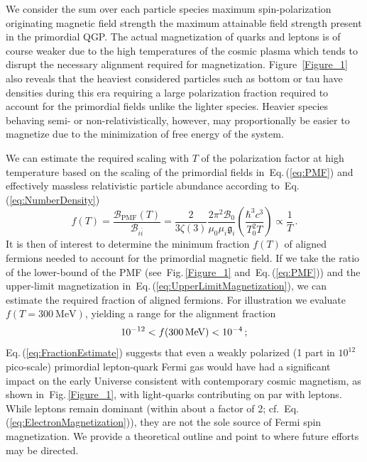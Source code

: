 \documentclass[epjST]{svjour}
\newcommand*{\MeV}{\text{\,MeV}}
\newcommand{\req}[1]{Eq.\,(\ref{#1})}
\newcommand{\rf}[1]{Fig.\,{\ref{#1}}}
\begin{document}
{\color{blue}We consider the sum over each particle species maximum spin-polarization originating magnetic field strength the maximum attainable field strength present in the primordial QGP. The actual magnetization of quarks and leptons is of course  weaker due to the high temperatures of the cosmic plasma which tends to disrupt the necessary alignment required for magnetization. Figure~\ref{Figure_1} also reveals that the heaviest considered particles such as bottom or tau have densities during this era requiring a large polarization fraction required to account for the primordial fields unlike the lighter species. Heavier species behaving semi- or non-relativistically, however, may proportionally be easier to magnetize due to the minimization of free energy of the system.}

{\color{red}We can estimate the required scaling with $T$ of the polarization factor at high temperature based on the scaling of the primordial fields in~\req{eq:PMF} and effectively massless relativistic particle abundance according to~\req{eq:NumberDensity}}
\begin{equation}
\label{eq:FractionAligned}
f(T) = \frac{\mathcal{B}_\mathrm{PMF}(T)}{\mathcal{B}_{i\bar{i}}} 
= \frac{2}{3\zeta(3)}\frac{2\pi^{2}\mathcal{B}_{0}}{\mu_{0}\mu_{i}\mathfrak{g}_{i}}\left(\frac{\hbar^{3}c^{3}}{T_{0}^{2}T}\right)\propto\frac{1}{T}\,.
\end{equation}
{\color{blue}It is then of interest to determine the minimum fraction \(f(T)\) of aligned fermions needed to account for the primordial magnetic field. If we take the ratio of the lower-bound of the PMF (see~\rf{Figure_1} and~\req{eq:PMF}) and the upper-limit magnetization in~\req{eq:UpperLimitMagnetization}, we can estimate the required fraction of aligned fermions. For illustration we evaluate \(f(T=300~\mathrm{MeV})\), yielding a range for the alignment fraction
\begin{equation}
\label{eq:FractionEstimate}
10^{-12} < f(300\MeV) < 10^{-4}\,;
\end{equation}
\req{eq:FractionEstimate}} suggests that even a weakly polarized ({\color{blue}1 part in $10^{12}$} pico-scale) primordial lepton-quark Fermi gas would have had a significant impact on the early Universe consistent with contemporary cosmic magnetism, as shown in~\rf{Figure_1}, with light-quarks contributing on par with leptons. While leptons remain dominant (within about a factor of 2; cf.~\req{eq:ElectronMagnetization}), they are not the sole source of Fermi spin magnetization. We provide a theoretical outline and point to where future efforts may be directed.
\end{document}
